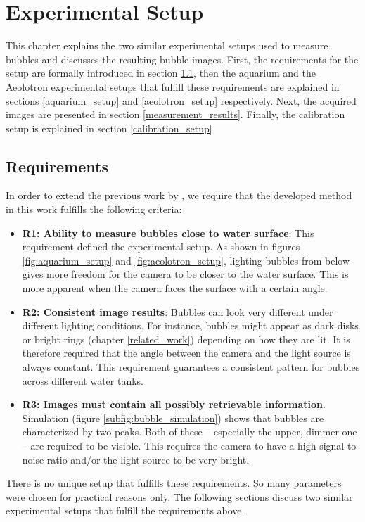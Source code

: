 \chapter{Experimental Setup}\label{experimental_setup}

	This chapter explains the two similar experimental setups used to measure bubbles and discusses the resulting bubble images. First, the requirements for the setup are formally introduced in section \ref{requirements}, then the aquarium and the Aeolotron experimental setups that fulfill these requirements are explained in sections \ref{aquarium_setup} and \ref{aeolotron_setup} respectively. Next, the acquired images are presented in section \ref{measurement_results}. Finally, the calibration setup is explained in section \ref{calibration_setup}  
	\section{Requirements}\label{requirements}
		In order to extend the previous work by \cite{Leonie}, we require that the developed method in this work fulfills the following criteria:
	\begin{itemize}
		\item \textbf{R1: Ability to measure bubbles close to water surface}: This requirement defined the experimental setup. As shown in figures \ref{fig:aquarium_setup} and \ref{fig:aeolotron_setup}, lighting bubbles from below gives more freedom for the camera to be closer to the water surface. This is more apparent when the camera faces the surface with a certain angle. 
		\item \textbf{R2: Consistent image results}: Bubbles can look very different under different lighting conditions. For instance, bubbles might appear as dark disks or bright rings (chapter \ref{related_work}) depending on how they are lit. It is therefore required that the angle between the camera and the light source is always constant. This requirement guarantees a consistent pattern for bubbles across different water tanks.
		\item \textbf{R3: Images must contain all possibly retrievable information}. Simulation (figure \ref{subfig:bubble_simulation}) shows that bubbles are characterized by two peaks. Both of these – especially the upper, dimmer one – are required to be visible. This requires the camera to have a high signal-to-noise ratio and/or the light source to be very bright. 
	\end{itemize}	
	
	There is no unique setup that fulfills these requirements. So many parameters were chosen for practical reasons only. The following sections discuss two similar experimental setups that fulfill the requirements above. 
	
